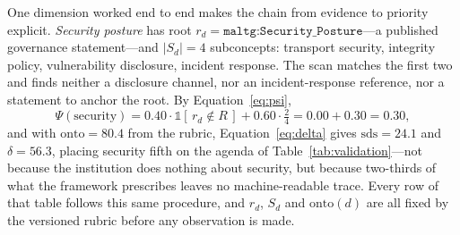 \documentclass[engproc,proceedingpaper,submit,moreauthors]{Definitions/mdpi}
\begin{document}
One dimension worked end to end makes the chain from evidence to priority explicit. \emph{Security posture} has root $r_d=\texttt{maltg:Security\_Posture}$---a published governance statement---and $|S_d|=4$ subconcepts: transport security, integrity policy, vulnerability disclosure, incident response. The scan matches the first two and finds neither a disclosure channel, nor an incident-response reference, nor a statement to anchor the root. By Equation~\eqref{eq:psi},
\[
\Psi(\text{security})=0.40\cdot\mathbb{1}[\,r_d\!\notin\!R\,]+0.60\cdot\tfrac{2}{4}=0.00+0.30=0.30,
\]
and with $\mathrm{onto}=80.4$ from the rubric, Equation~\eqref{eq:delta} gives $\mathrm{sds}=24.1$ and $\delta=56.3$, placing security fifth on the agenda of Table~\ref{tab:validation}---not because the institution does nothing about security, but because two-thirds of what the framework prescribes leaves no machine-readable trace. Every row of that table follows this same procedure, and $r_d$, $S_d$ and $\mathrm{onto}(d)$ are all fixed by the versioned rubric before any observation is made.
\end{document}
